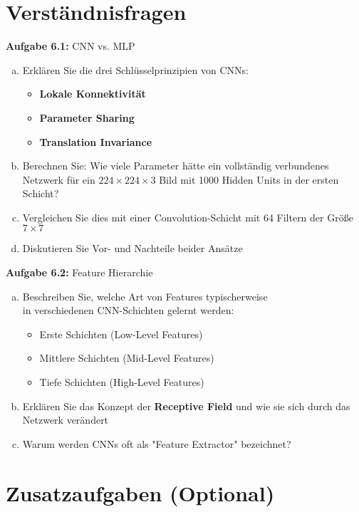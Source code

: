 \documentclass[12pt,a4paper]{article}
\begin{document}
\section{Verständnisfragen}

\textbf{Aufgabe 6.1:} CNN vs. MLP

\begin{enumerate}[(a)]
    \item Erklären Sie die drei Schlüsselprinzipien von CNNs:
    \begin{itemize}
        \item \textbf{Lokale Konnektivität}
        \item \textbf{Parameter Sharing}
        \item \textbf{Translation Invariance}
    \end{itemize}
    \item Berechnen Sie: Wie viele Parameter hätte ein vollständig verbundenes Netzwerk für ein $224 \times 224 \times 3$ Bild mit 1000 Hidden Units in der ersten Schicht?
    \item Vergleichen Sie dies mit einer Convolution-Schicht mit 64 Filtern der Größe $7 \times 7$
    \item Diskutieren Sie Vor- und Nachteile beider Ansätze
\end{enumerate}

\textbf{Aufgabe 6.2:} Feature Hierarchie

\begin{enumerate}[(a)]
    \item Beschreiben Sie, welche Art von Features typischerweise \\
    in verschiedenen CNN-Schichten gelernt werden:
    \begin{itemize}
        \item Erste Schichten (Low-Level Features)
        \item Mittlere Schichten (Mid-Level Features)  
        \item Tiefe Schichten (High-Level Features)
    \end{itemize}
    \item Erklären Sie das Konzept der \textbf{Receptive Field} und wie sie sich durch das Netzwerk verändert
    \item Warum werden CNNs oft als "Feature Extractor" bezeichnet?
\end{enumerate}

\section{Zusatzaufgaben (Optional)}
\end{document}
